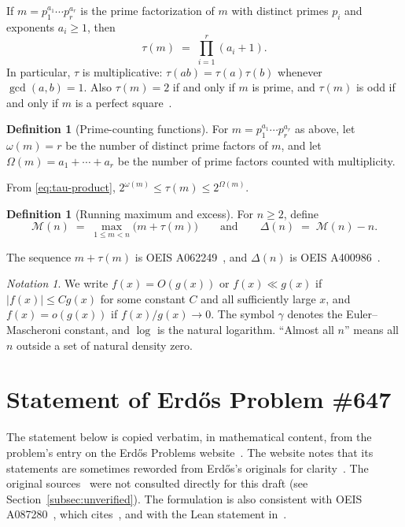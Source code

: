 \documentclass[11pt]{amsart}
\theoremstyle{plain}
\theoremstyle{definition}
\newtheorem{definition}[theorem]{Definition}
\theoremstyle{remark}
\newtheorem*{notation}{Notation}
\numberwithin{equation}{section}
\newcommand{\Mx}{\mathcal{M}}   %
\newcommand{\Dl}{\Delta}        %
\begin{document}
If $m=p_1^{a_1}\cdots p_r^{a_r}$ is the prime factorization of $m$ with distinct primes $p_i$ and exponents $a_i\ge 1$, then
\begin{equation}\label{eq:tau-product}
  \tau(m) \;=\; \prod_{i=1}^{r}(a_i+1).
\end{equation}
In particular, $\tau$ is multiplicative: $\tau(ab)=\tau(a)\tau(b)$ whenever $\gcd(a,b)=1$. Also $\tau(m)=2$ if and only if $m$ is prime, and $\tau(m)$ is odd if and only if $m$ is a perfect square~\cite[Ch.~16]{HardyWright2008}.

\begin{definition}[Prime-counting functions]\label{def:omega}
For $m=p_1^{a_1}\cdots p_r^{a_r}$ as above, let $\omega(m)=r$ be the number of distinct prime factors of $m$, and let $\Omega(m)=a_1+\cdots+a_r$ be the number of prime factors counted with multiplicity.
\end{definition}

From \eqref{eq:tau-product}, $2^{\omega(m)}\le\tau(m)\le 2^{\Omega(m)}$.

\begin{definition}[Running maximum and excess]\label{def:M}
For $n\ge 2$, define
\begin{equation}\label{eq:M}
  \Mx(n) \;=\; \max_{1\le m<n}\bigl(m+\tau(m)\bigr)
  \qquad\text{and}\qquad
  \Dl(n) \;=\; \Mx(n)-n.
\end{equation}
\end{definition}

The sequence $m+\tau(m)$ is OEIS A062249~\cite{OEIS_A062249}, and $\Dl(n)$ is OEIS A400986~\cite{OEIS_A400986}.

\begin{notation}
We write $f(x)=O(g(x))$ or $f(x)\ll g(x)$ if $|f(x)|\le Cg(x)$ for some constant $C$ and all sufficiently large $x$, and $f(x)=o(g(x))$ if $f(x)/g(x)\to 0$. The symbol $\gamma$ denotes the Euler--Mascheroni constant, and $\log$ is the natural logarithm. ``Almost all $n$'' means all $n$ outside a set of natural density zero.
\end{notation}

\section{Statement of Erd\H{o}s Problem \#647}\label{sec:statement}

The statement below is copied verbatim, in mathematical content, from the problem's entry on the Erd\H{o}s Problems website~\cite{Bloom647}. The website notes that its statements are sometimes reworded from Erd\H{o}s's originals for clarity~\cite{BloomFAQ}. The original sources~\cite{Erdos1979MathMag,Erdos1979Acta,Erdos1980Survey,Erdos1992Eureka,Erdos1995Octogon} were not consulted directly for this draft (see Section~\ref{subsec:unverified}). The formulation is also consistent with OEIS A087280~\cite{OEIS_A087280}, which cites~\cite[p.~68, Problem~4]{Erdos1979MathMag}, and with the Lean statement in~\cite{FormalConjectures647}.
\end{document}
